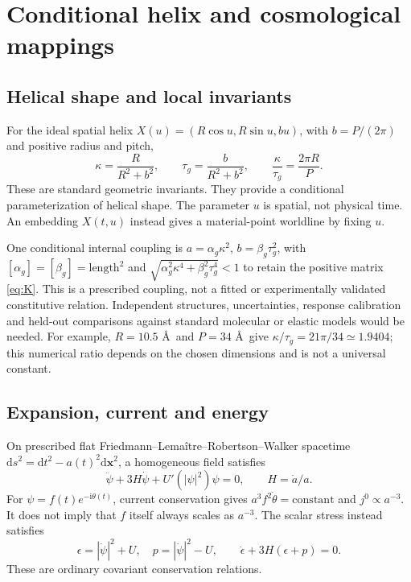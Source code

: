 \documentclass[aip,adv,reprint,onecolumn,amsmath,amssymb]{revtex4-2}
\newcommand{\ii}{\mathrm i}
\newcommand{\dd}{\mathrm d}
\begin{document}
\section{Conditional helix and cosmological mappings}
\label{app:mappings}
\subsection{Helical shape and local invariants}
For the ideal spatial helix $X(u)=(R\cos u,R\sin u,bu)$, with $b=P/(2\pi)$ and positive radius and pitch,
\begin{equation}
 \kappa=\frac R{R^2+b^2},\qquad \tau_g=\frac b{R^2+b^2},\qquad
 \frac\kappa{\tau_g}=\frac{2\pi R}P.
 \label{eq:helix}
\end{equation}
These are standard geometric invariants.\cite{kamien} They provide a conditional parameterization of helical shape. The parameter $u$ is spatial, not physical time. An embedding $X(t,u)$ instead gives a material-point worldline by fixing $u$.

One conditional internal coupling is $a=\alpha_g\kappa^2$, $b=\beta_g\tau_g^2$, with $[\alpha_g]=[\beta_g]=\mathrm{length}^2$ and $\sqrt{\alpha_g^2\kappa^4+\beta_g^2\tau_g^4}<1$ to retain the positive matrix \eqref{eq:K}. This is a prescribed coupling, not a fitted or experimentally validated constitutive relation. Independent structures, uncertainties, response calibration and held-out comparisons against standard molecular or elastic models would be needed.\cite{drew} For example, $R=10.5$ \AA\ and $P=34$ \AA\ give $\kappa/\tau_g=21\pi/34\simeq1.9404$; this numerical ratio depends on the chosen dimensions and is not a universal constant.

\subsection{Expansion, current and energy}
On prescribed flat Friedmann--Lema\^itre--Robertson--Walker spacetime $\dd s^2=\dd t^2-a(t)^2\dd\bm x^2$, a homogeneous field satisfies
\begin{equation}
 \ddot\psi+3H\dot\psi+U'(|\psi|^2)\psi=0,\qquad H=\dot a/a.
 \label{eq:cosmo-pde}
\end{equation}
For $\psi=f(t)e^{-\ii\theta(t)}$, current conservation gives $a^3f^2\dot\theta=\mathrm{constant}$ and $j^0\propto a^{-3}$. It does not imply that $f$ itself always scales as $a^{-3}$. The scalar stress instead satisfies
\begin{equation}
 \epsilon=|\dot\psi|^2+U,\quad p=|\dot\psi|^2-U,\qquad
 \dot\epsilon+3H(\epsilon+p)=0.
 \label{eq:cosmo-energy}
\end{equation}
These are ordinary covariant conservation relations.\cite{wald,turner}
\end{document}
